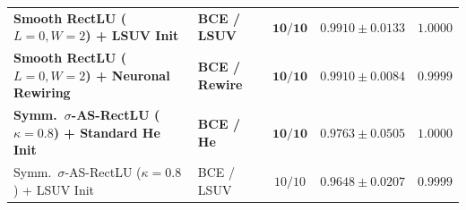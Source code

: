 \documentclass[11pt, a4paper]{article}
\begin{document}
\begin{table}[htbp]
{\begin{tabular}{llccc}
\textbf{Smooth RectLU ($L=0, W=2$) + LSUV Init \cite{ref32}} & \textbf{BCE / LSUV} & $\mathbf{10/10}$ & $\mathbf{0.9910 \pm 0.0133}$ & $\mathbf{1.0000}$ \\
\textbf{Smooth RectLU ($L=0, W=2$) + Neuronal Rewiring \cite{ref40}} & \textbf{BCE / Rewire} & $\mathbf{10/10}$ & $\mathbf{0.9910 \pm 0.0084}$ & $\mathbf{0.9999}$ \\
\textbf{Symm.\ $\sigma$-AS-RectLU ($\kappa=0.8$) + Standard He Init \cite{ref26}} & \textbf{BCE / He} & $\mathbf{10/10}$ & $\mathbf{0.9763 \pm 0.0505}$ & $\mathbf{1.0000}$ \\
Symm.\ $\sigma$-AS-RectLU ($\kappa=0.8$) + LSUV Init \cite{ref32} & BCE / LSUV & $10/10$ & $0.9648 \pm 0.0207$ & $0.9999$ \\
\hline
\end{tabular}%
}
\end{table}
\end{document}
